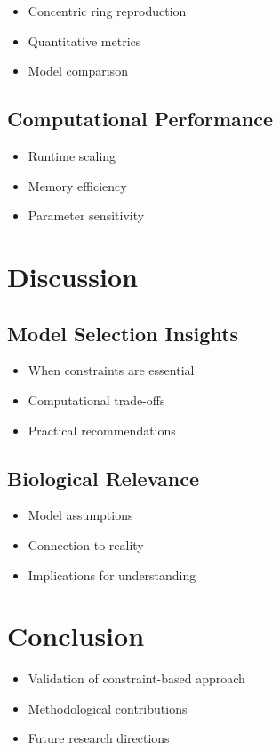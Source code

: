 \documentclass[conference]{IEEEtran}
\begin{document}
\begin{itemize}
    \item Concentric ring reproduction
    \item Quantitative metrics
    \item Model comparison
\end{itemize}

\subsection{Computational Performance}
\begin{itemize}
    \item Runtime scaling
    \item Memory efficiency
    \item Parameter sensitivity
\end{itemize}

\section{Discussion}
\subsection{Model Selection Insights}
\begin{itemize}
    \item When constraints are essential
    \item Computational trade-offs
    \item Practical recommendations
\end{itemize}

\subsection{Biological Relevance}
\begin{itemize}
    \item Model assumptions
    \item Connection to reality
    \item Implications for understanding
\end{itemize}

\section{Conclusion}
\begin{itemize}
    \item Validation of constraint-based approach
    \item Methodological contributions
    \item Future research directions
\end{itemize}



\end{document}
